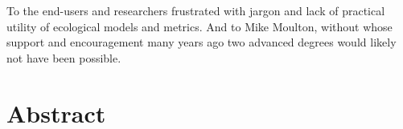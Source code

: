 \documentclass[12pt,twoside,openany]{reedthesis}
\begin{document}
  \listoffigures

  \begin{dedication}
    To the end-users and researchers frustrated with jargon and lack of
    practical utility of ecological models and metrics. And to Mike Moulton,
    without whose support and encouragement many years ago two advanced
    degrees would likely not have been possible.
  \end{dedication}
\mainmatter %
\pagestyle{fancyplain} %
\linespread{1} %

\chapter*{Abstract}\label{abstract}
\end{document}
